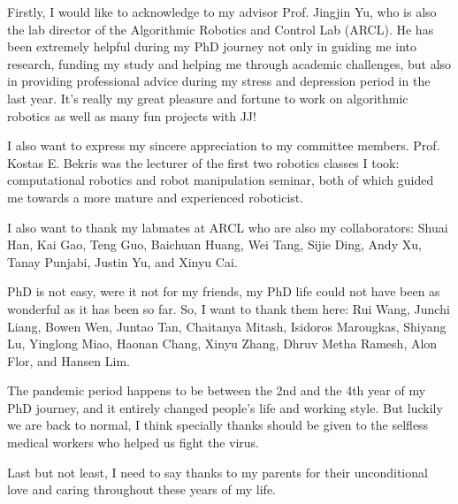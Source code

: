 
\begin{acknowledgments}
Firstly, I would like to acknowledge to my advisor Prof. Jingjin Yu, 
who is also the lab director of the Algorithmic Robotics and Control Lab (ARCL). 
He has been extremely helpful during my PhD journey 
not only in guiding me into research, funding my study and helping me through academic challenges, 
but also in providing professional advice during my stress and depression period in the last year. 
It's really my great pleasure and fortune to work on algorithmic robotics 
as well as many fun projects with JJ! 

I also want to express my sincere appreciation to my committee members. 
Prof. Kostas E. Bekris was the lecturer of the first two robotics classes I took: 
computational robotics and robot manipulation seminar, both of which guided me 
towards a more mature and experienced roboticist. 

I also want to thank my labmates at ARCL who are also my collaborators: Shuai Han, 
Kai Gao, Teng Guo, Baichuan Huang, Wei Tang, Sijie Ding, Andy Xu, Tanay Punjabi, 
Justin Yu, and Xinyu Cai. 

PhD is not easy, were it not for my friends, my PhD life 
could not have been as wonderful as it has been so far. 
So, I want to thank them here: Rui Wang, Junchi Liang, Bowen Wen, Juntao Tan, Chaitanya Mitash, 
Isidoros Marougkas, Shiyang Lu, Yinglong Miao, Haonan Chang, Xinyu Zhang, 
Dhruv Metha Ramesh, Alon Flor, and Hansen Lim. 

The pandemic period happens to be between the 2nd and the 4th year of my PhD journey, 
and it entirely changed people's life and working style. 
But luckily we are back to normal, I think specially thanks should be given to the 
selfless medical workers who helped us fight the virus. 

Last but not least, I need to say thanks to my parents for their unconditional love 
and caring throughout these years of my life. 

\end{acknowledgments}
